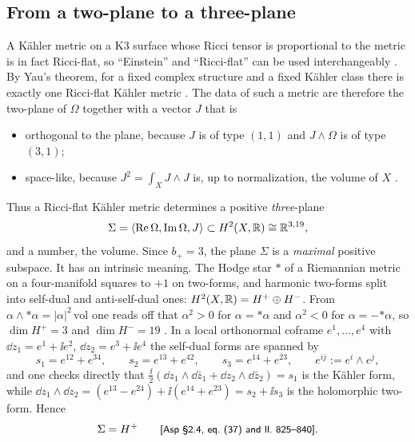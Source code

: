 \subsection{From a two-plane to a three-plane}
A Kähler metric on a K3 surface whose Ricci tensor is proportional to the metric is in fact
Ricci-flat, so ``Einstein'' and ``Ricci-flat'' can be used interchangeably
. By Yau's theorem, for a fixed complex
structure and a fixed Kähler class there is exactly one Ricci-flat Kähler metric
. The data of such a metric are therefore the two-plane of
$\Omega$ together with a vector $J$ that is
\begin{itemize}[leftmargin=*,itemsep=1pt]
\item orthogonal to the plane, because $J$ is of type $(1,1)$ and $J\wedge\Omega$ is of type
 $(3,1)$;
\item space-like, because $J^2=\int_XJ\wedge J$ is, up to normalization, the volume of $X$
 .
\end{itemize}
Thus a Ricci-flat Kähler metric determines a positive \emph{three}-plane
\begin{equation}\label{eq:k3lattice:Sigma}
 \Sigma=\langle\operatorname{Re}\Omega,\operatorname{Im}\Omega,J\rangle\subset
 H^2(X,\mathbb{R})\cong\mathbb{R}^{3,19} ,
\end{equation}
and a number, the volume. Since $b_+=3$, the plane $\Sigma$ is a \emph{maximal} positive
subspace. It has an intrinsic meaning. The Hodge star $*$ of a Riemannian metric on a
four-manifold squares to $+1$ on two-forms, and harmonic two-forms split into self-dual and
anti-self-dual ones: $H^2(X,\mathbb{R})=H^+\oplus H^-$. From $\alpha\wedge{*\alpha}=|\alpha|^2\,
\mathrm{vol}$ one reads off that $\alpha^2>0$ for $\alpha=*\alpha$ and $\alpha^2<0$ for
$\alpha=-{*\alpha}$, so $\dim H^+=3$ and $\dim H^-=19$
. In a local orthonormal coframe
$e^1,\dots,e^4$ with $\dd z_1=e^1+\ii e^2$, $\dd z_2=e^3+\ii e^4$ the self-dual forms are
spanned by
\begin{equation}\label{eq:k3lattice:sd}
 s_1=e^{12}+e^{34},\qquad s_2=e^{13}+e^{42},\qquad s_3=e^{14}+e^{23},
 \qquad e^{ij}:=e^i\wedge e^j ,
\end{equation}
and one checks directly that $\tfrac{\ii}{2}(\dd z_1\wedge\dd\bar z_1+\dd z_2\wedge\dd\bar
z_2)=s_1$ is the Kähler form, while $\dd z_1\wedge\dd z_2=(e^{13}-e^{24})+\ii(e^{14}+e^{23})
=s_2+\ii s_3$ is the holomorphic two-form. Hence
\begin{equation}\label{eq:k3lattice:SigmaHplus}
 \Sigma=H^+\qquad\text{{\small\textsf{[Asp §2.4, eq.~(37) and ll.~825--840]}}} .
\end{equation}

